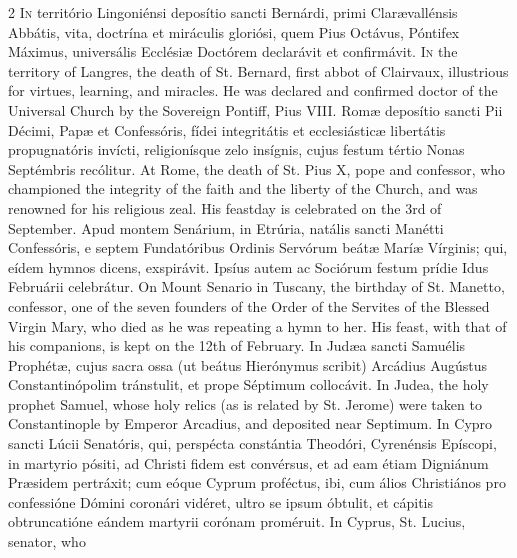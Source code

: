 \begin{paracol}{2}
\lettrine[lines=2]{I}{n} território 
 Lingoniénsi deposítio sancti Bernárdi, primi Clarævallénsis Abbátis, vita, 
 doctrína et miráculis gloriósi, quem Pius Octávus, Póntifex Máximus, 
 universális Ecclésiæ Doctórem declarávit et confirmávit.
\switchcolumn
{}
\lettrine[lines=2]{I}{n} the territory of Langres, the 
 death of St. Bernard, first abbot of Clairvaux, illustrious for virtues, 
 learning, and miracles. He was declared and confirmed doctor of the 
 Universal Church by the Sovereign Pontiff, Pius VIII.
\switchcolumn*
{}
Romæ deposítio sancti 
 Pii Décimi, Papæ et Confessóris, fídei integritátis et ecclesiásticæ 
 libertátis propugnatóris invícti, religionísque zelo insígnis, cujus festum 
 tértio Nonas Septémbris recólitur.
\switchcolumn
{}
At Rome, the death of St. Pius X, 
 pope and confessor, who championed the integrity of the faith and the 
 liberty of the Church, and was renowned for his religious zeal. His 
 feastday is celebrated on the 3rd of September.
\switchcolumn*
{}
Apud montem Senárium, 
 in Etrúria, natális sancti Manétti Confessóris, e septem Fundatóribus 
 Ordinis Servórum beátæ Maríæ Vírginis; qui, eídem hymnos dicens, exspirávit. 
 Ipsíus autem ac Sociórum festum prídie Idus Februárii celebrátur.
\switchcolumn
{}
On Mount Senario in Tuscany, the 
 birthday of St. Manetto, confessor, one of the seven founders of the Order 
 of the Servites of the Blessed Virgin Mary, who died as he was repeating a 
 hymn to her. His feast, with that of his companions, is kept on the 
 12th of February.
\switchcolumn*
{}
In Judæa sancti 
 Samuélis Prophétæ, cujus sacra ossa (ut beátus Hierónymus scribit) Arcádius 
 Augústus Constantinópolim tránstulit, et prope Séptimum collocávit.
\switchcolumn
{}
In Judea, the holy prophet Samuel, 
 whose holy relics (as is related by St. Jerome) were taken to Constantinople 
 by Emperor Arcadius, and deposited near Septimum.
\switchcolumn*
{}
In Cypro sancti Lúcii 
 Senatóris, qui, perspécta constántia Theodóri, Cyrenénsis Epíscopi, in 
 martyrio pósiti, ad Christi fidem est convérsus, et ad eam étiam Digniánum 
 Præsidem pertráxit; cum eóque Cyprum proféctus, ibi, cum álios Christiános 
 pro confessióne Dómini coronári vidéret, ultro se ipsum óbtulit, et cápitis 
 obtruncatióne eándem martyrii corónam proméruit.
\switchcolumn
{}
In Cyprus, St. Lucius, senator, who 

\end{paracol}
